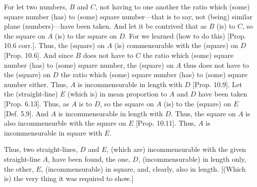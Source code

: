 \begin{Parallel}{}{}
{For let two numbers, $B$ and $C$,  not having to one another
the ratio which (some) square number (has) to (some) square number---that
is to say, not (being) similar plane (numbers)---have been taken. And let it be contrived
that as $B$ (is) to $C$, so the square on $A$ (is) to the square on $D$.
For we learned (how to do this) [Prop. 10.6 corr.].
Thus, the (square) on $A$ (is) commensurable with the (square) on $D$
[Prop. 10.6]. And since $B$ does not have to $C$ the
ratio which (some) square number (has) to (some) square number, the
(square) on $A$ thus does not have to the (square) on $D$ the ratio which (some) square number (has) to (some) square number either. Thus, $A$ is
incommensurable in length with $D$ [Prop. 10.9].
Let the (straight-line) $E$ (which is) in mean proportion to $A$ and $D$ have
been taken [Prop. 6.13]. Thus, as $A$ is to $D$, so the square on $A$ (is) to the (square)
on $E$ [Def. 5.9]. And $A$ is incommensurable in length with $D$. Thus, the square on $A$ is also incommensurble
with the square on $E$ [Prop. 10.11]. 
Thus, $A$ is incommensurable in square with $E$.

Thus, two straight-lines, $D$ and $E$, (which are) incommensurable with the given
straight-line $A$, have been found, the one, $D$, (incommensurable)
in length only, the other, $E$, (incommensurable) in square, and, clearly, also in length. [(Which is) the very thing it was required to show.]}
\end{Parallel}


\vspace{7pt}{\footnotesize\noindent$^\dag$ This whole proposition is regarded by Heiberg as an interpolation into the original text.}

